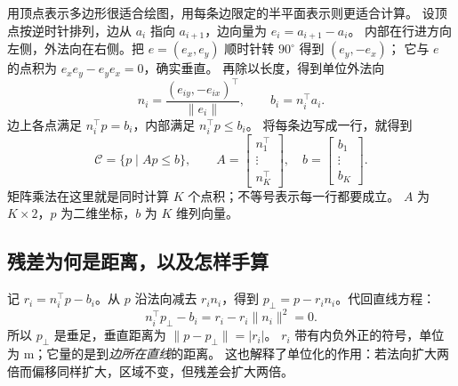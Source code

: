 用顶点表示多边形很适合绘图，用每条边限定的半平面表示则更适合计算。
设顶点按逆时针排列，边从 $a_i$ 指向 $a_{i+1}$，边向量为 $e_i=a_{i+1}-a_i$。
内部在行进方向左侧，外法向在右侧。把 $e=(e_x,e_y)$ 顺时针转 $90^\circ$ 得到 $(e_y,-e_x)$；
它与 $e$ 的点积为 $e_xe_y-e_ye_x=0$，确实垂直。
再除以长度，得到单位外法向
\begin{equation}
n_i=\frac{(e_{iy},-e_{ix})^\top}{\|e_i\|},\qquad b_i=n_i^\top a_i.
\end{equation}
边上各点满足 $n_i^\top p=b_i$，内部满足 $n_i^\top p\leq b_i$。
将每条边写成一行，就得到
\begin{equation}
\mathcal C=\{p\mid Ap\leq b\},\qquad
A=\begin{bmatrix}n_1^\top\\\vdots\\n_K^\top\end{bmatrix},\quad
b=\begin{bmatrix}b_1\\\vdots\\b_K\end{bmatrix}.
\end{equation}
矩阵乘法在这里就是同时计算 $K$ 个点积；不等号表示每一行都要成立。
$A$ 为 $K\times2$，$p$ 为二维坐标，$b$ 为 $K$ 维列向量。

\begin{center}
\end{center}

\subsection{残差为何是距离，以及怎样手算}
记 $r_i=n_i^\top p-b_i$。从 $p$ 沿法向减去 $r_i n_i$，得到
$p_\perp=p-r_i n_i$。代回直线方程：
\begin{equation}
n_i^\top p_\perp-b_i=r_i-r_i\|n_i\|^2=0.
\end{equation}
所以 $p_\perp$ 是垂足，垂直距离为 $\|p-p_\perp\|=|r_i|$。
$r_i$ 带有内负外正的符号，单位为 m；它量的是到\emph{边所在直线}的距离。
这也解释了单位化的作用：若法向扩大两倍而偏移同样扩大，区域不变，但残差会扩大两倍。

